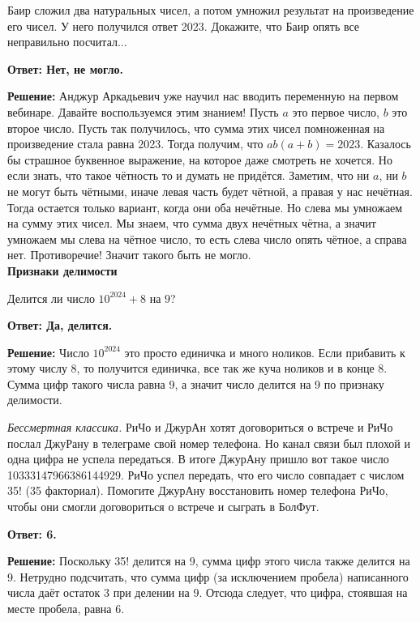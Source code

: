 Баир сложил два натуральных чисел, а потом умножил результат на произведение его чисел. У него получился ответ 2023. Докажите, что Баир опять все неправильно посчитал...

\textbf{Ответ: Нет, не могло.}

\textbf{Решение:} Анджур Аркадьевич уже научил нас вводить переменную на первом вебинаре. Давайте воспользуемся этим знанием! Пусть $a$ это первое число, $b$ это второе число. Пусть так получилось, что сумма этих чисел помноженная на произведение стала равна 2023. Тогда получим, что $ab(a+b)=2023$. Казалось бы страшное буквенное выражение, на которое даже смотреть не хочется. Но если знать, что такое чётность то и думать не придётся. Заметим, что ни $a$, ни $b$ не могут быть чётными, иначе левая часть будет чётной, а правая у нас нечётная. Тогда остается только вариант, когда они оба нечётные. Но слева мы умножаем на сумму этих чисел. Мы знаем, что сумма двух нечётных чётна, а значит умножаем мы слева на чётное число, то есть слева число опять чётное, а справа нет. Противоречие! Значит такого быть не могло.\\

\noindent\textbf{\Large Признаки делимости}

 Делится ли число $10^{2024}+8$ на $9$?

\textbf{Ответ: Да, делится.}

\textbf{Решение:} Число $10^{2024}$ это просто единичка и много ноликов. Если прибавить к этому числу 8, то получится единичка, все так же куча ноликов и в конце 8. Сумма цифр такого числа равна 9, а значит число делится на 9 по признаку делимости.

\textit{Бессмертная классика.} РиЧо и ДжурАн хотят договориться о встрече и РиЧо послал ДжуРану в телеграме свой номер телефона. Но канал связи был плохой и одна цифра не успела передаться.
\newpage
\noindent В итоге ДжурАну пришло вот такое число 10333147966386144929. РиЧо успел передать, что его число совпадает с числом 35! (35 факториал). Помогите ДжурАну восстановить номер телефона РиЧо, чтобы они смогли договориться о встрече и сыграть в БолФут.

\textbf{Ответ: 6.}

\textbf{Решение:} Поскольку 35! делится на 9, сумма цифр этого числа также делится на 9. Нетрудно подсчитать, что сумма цифр (за исключением пробела) написанного числа даёт остаток 3 при делении на 9. Отсюда следует, что цифра, стоявшая на месте пробела, равна 6.


